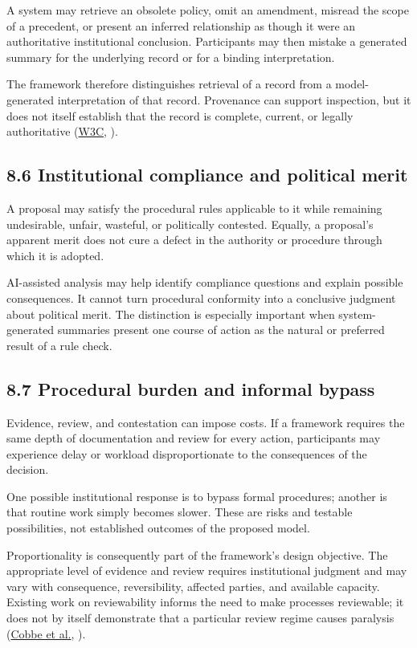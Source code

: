 \documentclass[
  10pt,
]{article}
\newcommand{\axCite}[2]{\hyperlink{cite.#1}{#2}, \citeyear{#1}}
\begin{document}
A system may retrieve an obsolete policy, omit an amendment, misread the
scope of a precedent, or present an inferred relationship as though it
were an authoritative institutional conclusion. Participants may then
mistake a generated summary for the underlying record or for a binding
interpretation.

The framework therefore distinguishes retrieval of a record from a
model-generated interpretation of that record. Provenance can support
inspection, but it does not itself establish that the record is
complete, current, or legally authoritative (\axCite{w3c2013provdm}{W3C}).

\subsection{8.6 Institutional compliance and political
merit}\label{institutional-compliance-and-political-merit}

A proposal may satisfy the procedural rules applicable to it while
remaining undesirable, unfair, wasteful, or politically contested.
Equally, a proposal's apparent merit does not cure a defect in the
authority or procedure through which it is adopted.

AI-assisted analysis may help identify compliance questions and explain
possible consequences. It cannot turn procedural conformity into a
conclusive judgment about political merit. The distinction is especially
important when system-generated summaries present one course of action
as the natural or preferred result of a rule check.

\subsection{8.7 Procedural burden and informal
bypass}\label{procedural-burden-and-informal-bypass}

Evidence, review, and contestation can impose costs. If a framework
requires the same depth of documentation and review for every action,
participants may experience delay or workload disproportionate to the
consequences of the decision.

One possible institutional response is to bypass formal procedures;
another is that routine work simply becomes slower. These are risks and
testable possibilities, not established outcomes of the proposed model.

Proportionality is consequently part of the framework's design
objective. The appropriate level of evidence and review requires
institutional judgment and may vary with consequence, reversibility,
affected parties, and available capacity. Existing work on reviewability
informs the need to make processes reviewable; it does not by itself
demonstrate that a particular review regime causes paralysis (\axCite{cobbe2021reviewable}{Cobbe et al.}).
\end{document}
